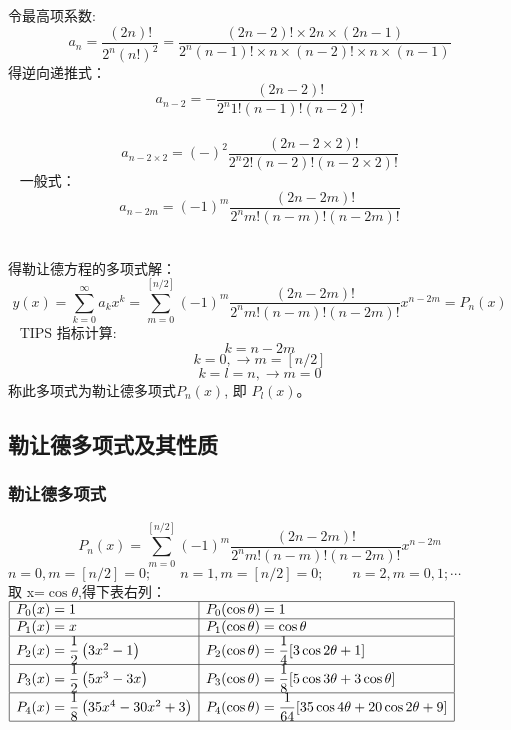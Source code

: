 \begin{frame}
	令最高项系数: \[a_n=\frac{(2n)!}{2^n (n!)^2} = \frac{(2n-2)!\times 2n \times (2n-1)}{2^n (n-1)!\times n \times (n-2)!\times n \times (n-1)  } \]
	得逆向递推式：
	\begin{equation*}
		a_{n-2}=-\frac{(2 n-2) !}{2^{n} 1! (n-1) !(n-2) !}
	\end{equation*}	 
	\begin{equation*}
		a_{n-2\times2}=(-)^2\frac{(2 n-2\times2) !}{2^{n} 2! (n-2) !(n-2\times2) !}
	\end{equation*}	 
	一般式：
	\begin{equation*}
		a_{n-2 m}=(-1)^{m} \frac{(2 n-2 m) !}{2^{n} m !(n-m) !(n-2 m) !}
	\end{equation*}	 
\end{frame}	

\begin{frame}
	得勒让德方程的多项式解：
	\begin{equation*}
		y(x)=\sum_{k=0}^{\infty}a_k x^k =\sum_{m=0}^{[n / 2]}(-1)^{m} \frac{(2 n-2 m) !}{2^{n} m !(n-m) !(n-2 m) !} x^{n-2 m}=P_{n}(x)
	\end{equation*}	 
	TIPS 指标计算:
	\[ k=n-2m \]
	\[k=0, \to  m=[n/2] \]
	\[k=l=n, \to m=0 \]
	称此多项式为勒让德多项式$P_n(x)$, 即 $P_l(x)$。
\end{frame}	

\subsection{勒让德多项式及其性质}

\begin{frame}
	\frametitle{勒让德多项式}
	\[P_{n}(x)=\sum_{m=0}^{[n / 2]}(-1)^{m} \frac{(2 n-2 m) !}{2^{n} m !(n-m) !(n-2 m) !} x^{n-2 m}\]
	\[ n=0, m=[n/2]=0; \qquad n=1, m=[n/2]=0; \qquad n=2, m=0,1 ; \cdots \hspace{5em}\]
	取 x=$\cos\theta$,得下表右列：\\ \vspace{0.3em}
	{\small $\begin{array}{|l|l|}
		\hline P_{0}(x)=1 & P_{0}(\cos\theta)=1\\
		\hline P_{1}(x)=x & P_{1}(\cos \theta)=\cos \theta \\
		\hline P_{2}(x)=\dfrac{1}{2}\left(3 x^{2}-1\right) & P_{2}(\cos \theta)=\dfrac{1}{4}[3 \cos 2 \theta+1] \\ 
		\hline P_{3}(x)=\dfrac{1}{2}\left(5 x^{3}-3 x\right) & P_{3}(\cos \theta)=\dfrac{1}{8}[5 \cos 3 \theta+3 \cos \theta] \\
		\hline P_{4}(x)=\dfrac{1}{8}\left(35 x^{4}-30 x^{2}+3\right) & P_{4}(\cos \theta)=\dfrac{1}{64}[35 \cos 4 \theta+20 \cos 2 \theta+9] \\
		\hline
	\end{array}$}
\end{frame}	 

